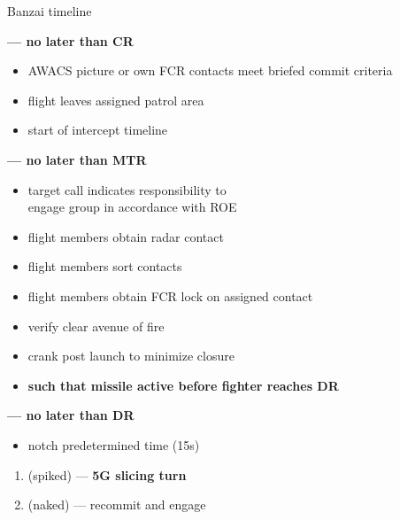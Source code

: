 \begin{checklistenumerate}[start=0]
{\begin{tikzpicture}[figstyle]
        \end{tikzpicture}
        \caption{Banzai timeline}
        \label{fig:ttpaa:timeline:banzai}
    }%
    \textbf{--- no later than CR}
    \begin{itemize}
        \item AWACS picture or own FCR contacts meet briefed commit criteria
        \item flight leaves assigned patrol area
        \item start of intercept timeline
    \end{itemize}

    \blueitem[Target] \textbf{--- no later than MTR}
    \label{subsec:ttpaa:timeline:banzai:target}
    \begin{itemize}
        \item target call indicates responsibility to \\
        engage group in accordance with ROE
        \item flight members obtain radar contact
    \end{itemize}

    \blueitem[Sort]
    \label{subsec:ttpaa:timeline:banzai:sort}
    \begin{itemize}
        \item flight members sort contacts
        \item flight members obtain FCR lock on assigned contact
    \end{itemize}

    \label{subsec:ttpaa:timeline:banzai:shoot}
    \begin{itemize} 
        \item verify clear avenue of fire
        \item crank post launch to minimize closure
        \item \textbf{such that missile active before fighter reaches DR}
    \end{itemize}
    
    \blueitem[Notch] \textbf{--- no later than DR}
    \label{subsec:ttpaa:timeline:banzai:notch}
    \begin{itemize} 
        \item notch predetermined time (15s)
    \end{itemize}
    \begin{enumerate}[label=\textbf{\arabic{enumi}\alph*.}]
        \item {} (spiked) --- \textbf{5G slicing turn}%
        \label{subsec:ttpaa:timeline:banzai:abort}%
        \item {} (naked) --- recommit and engage%
        \label{subsec:ttpaa:timeline:banzai:banzai}%
    \end{enumerate}
    
\end{checklistenumerate}

